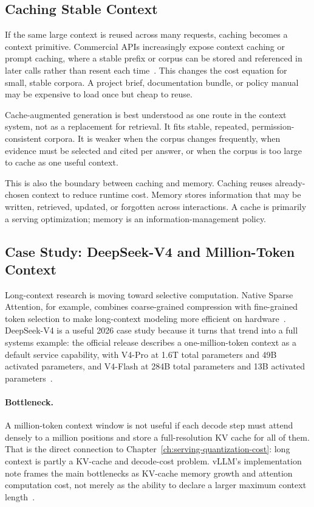 \subsection{Caching Stable Context}

If the same large context is reused across many requests, caching becomes a context primitive. Commercial APIs increasingly expose context caching or prompt caching, where a stable prefix or corpus can be stored and referenced in later calls rather than resent each time~\cite{google2026contextcaching}. This changes the cost equation for small, stable corpora. A project brief, documentation bundle, or policy manual may be expensive to load once but cheap to reuse.

Cache-augmented generation is best understood as one route in the context system, not as a replacement for retrieval. It fits stable, repeated, permission-consistent corpora. It is weaker when the corpus changes frequently, when evidence must be selected and cited per answer, or when the corpus is too large to cache as one useful context.

This is also the boundary between caching and memory. Caching reuses already-chosen context to reduce runtime cost. Memory stores information that may be written, retrieved, updated, or forgotten across interactions. A cache is primarily a serving optimization; memory is an information-management policy.

\subsection{Case Study: DeepSeek-V4 and Million-Token Context}

Long-context research is moving toward selective computation. Native Sparse Attention, for example, combines coarse-grained compression with fine-grained token selection to make long-context modeling more efficient on hardware~\cite{yuan2025nsa}. DeepSeek-V4 is a useful 2026 case study because it turns that trend into a full systems example: the official release describes a one-million-token context as a default service capability, with V4-Pro at 1.6T total parameters and 49B activated parameters, and V4-Flash at 284B total parameters and 13B activated parameters~\cite{deepseek2026v4release,deepseek2026v4hf}.

\paragraph{Bottleneck.} A million-token context window is not useful if each decode step must attend densely to a million positions and store a full-resolution KV cache for all of them. That is the direct connection to Chapter~\ref{ch:serving-quantization-cost}: long context is partly a KV-cache and decode-cost problem. vLLM's implementation note frames the main bottlenecks as KV-cache memory growth and attention computation cost, not merely as the ability to declare a larger maximum context length~\cite{vllm2026deepseekv4}.

